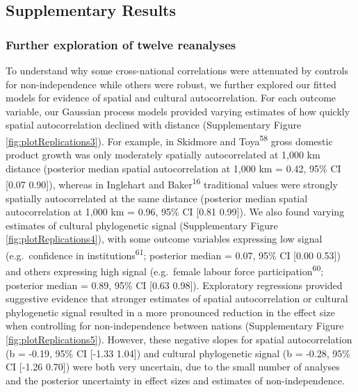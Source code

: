 \documentclass[
  man,floatsintext]{apa6}
\begin{document}
\newpage

\hypertarget{supplementary-results}{%
\subsection{Supplementary Results}\label{supplementary-results}}

\hypertarget{further-exploration-of-twelve-reanalyses}{%
\subsubsection{Further exploration of twelve reanalyses}\label{further-exploration-of-twelve-reanalyses}}

To understand why some cross-national correlations were attenuated by controls for non-independence while others were robust, we further explored our fitted models for evidence of spatial and cultural autocorrelation. For each outcome variable, our Gaussian process models provided varying estimates of how quickly spatial autocorrelation declined with distance (Supplementary Figure \ref{fig:plotReplications3}). For example, in Skidmore and Toya\textsuperscript{58} gross domestic product growth was only moderately spatially autocorrelated at 1,000 km distance (posterior median spatial autocorrelation at 1,000 km = 0.42, 95\% CI {[}0.07 0.90{]}), whereas in Inglehart and Baker\textsuperscript{16} traditional values were strongly spatially autocorrelated at the same distance (posterior median spatial autocorrelation at 1,000 km = 0.96, 95\% CI {[}0.81 0.99{]}). We also found varying estimates of cultural phylogenetic signal (Supplementary Figure \ref{fig:plotReplications4}), with some outcome variables expressing low signal (e.g.~confidence in institutions\textsuperscript{61}; posterior median = 0.07, 95\% CI {[}0.00 0.53{]}) and others expressing high signal (e.g.~female labour force participation\textsuperscript{60}; posterior median = 0.89, 95\% CI {[}0.63 0.98{]}). Exploratory regressions provided suggestive evidence that stronger estimates of spatial autocorrelation or cultural phylogenetic signal resulted in a more pronounced reduction in the effect size when controlling for non-independence between nations (Supplementary Figure \ref{fig:plotReplications5}). However, these negative slopes for spatial autocorrelation (b = -0.19, 95\% CI {[}-1.33 1.04{]}) and cultural phylogenetic signal (b = -0.28, 95\% CI {[}-1.26 0.70{]}) were both very uncertain, due to the small number of analyses and the posterior uncertainty in effect sizes and estimates of non-independence.
\end{document}
